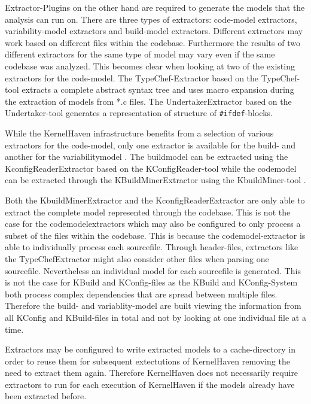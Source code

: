 \documentclass[a4paper]{article}
\begin{document}
Extractor-Plugins on the other hand are required to generate the models that the analysis can run on. There are three types of extractors: code-model extractors, variability-model extractors and build-model extractors. Different extractors may work based on different files within the codebase. Furthermore the results of two different extractors for the same type of model may vary even if the same codebase was analyzed. This becomes clear when looking at two of the existing extractors for the code-model. The TypeChef-Extractor based on the TypeChef-tool \cite{Kenner:2010:TTT:1868688.1868693} extracts a complete abstract syntax tree and uses macro expansion during the extraction of models from *.c files. The UndertakerExtractor based on the Undertaker-tool \cite{Tartler:2011:FCC:1966445.1966451} generates a representation of structure of \texttt{\#ifdef}-blocks.

While the KernelHaven infrastructure benefits from a selection of various extractors for the code-model, only one extractor is available for the build- and another for the variabilitymodel \cite{KernelHave-wh}. The buildmodel can be extracted using the KconfigReaderExtractor based on the KConfigReader-tool \cite{ck-kconfig} while the codemodel can be extracted through the KBuildMinerExtractor using the KbuildMiner-tool \cite{ck-kbuild}.

Both the KbuildMinerExtractor and the KconfigReaderExtractor are only able to extract the complete model represented through the codebase. This is not the case for the codemodelextractors which may also be configured to only process a subset of the files within the codebase. This is because the codemodel-extractor is able to individually process each sourcefile. Through header-files, extractors like the TypeChefExtractor might also consider other files when parsing one sourcefile. Nevertheless an individual model for each sourcefile is generated. This is not the case for KBuild and KConfig-files as the KBuild and KConfig-System both process complex dependencies that are spread between multiple files. Therefore the build- and variablity-model are built viewing the information from all KConfig and KBuild-files in total and not by looking at one individual file at a time.

Extractors may be configured to write extracted models to a cache-directory in order to reuse them for subsequent extectutions of KernelHaven removing the need to extract them again. Therefore KernelHaven does not necessarily require extractors to run for each execution of KernelHaven if the models already have been extracted before.
\end{document}

